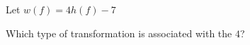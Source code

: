 \documentclass{ximera}
\begin{document}
\begin{exercise}
\begin{question}


Let $w(f) = 4 h(f) - 7$


Which type of transformation is associated with the $4$?


\begin{multipleChoice}
\end{multipleChoice}


\end{question}










\end{exercise}
\end{document}

